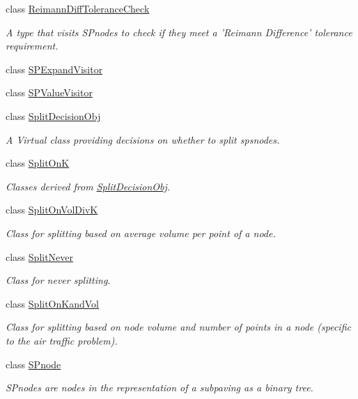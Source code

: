 \begin{DoxyCompactItemize}
class \hyperlink{classsubpavings_1_1ReimannDiffToleranceCheck}{\-Reimann\-Diff\-Tolerance\-Check}
\begin{DoxyCompactList}\small\item\em \-A type that visits  \-S\-Pnodes to check if they meet a '\-Reimann \-Difference' tolerance requirement. \end{DoxyCompactList}\item 
class \hyperlink{classsubpavings_1_1SPExpandVisitor}{\-S\-P\-Expand\-Visitor}
\item 
class \hyperlink{classsubpavings_1_1SPValueVisitor}{\-S\-P\-Value\-Visitor}
\item 
class \hyperlink{classsubpavings_1_1SplitDecisionObj}{\-Split\-Decision\-Obj}
\begin{DoxyCompactList}\small\item\em \-A \-Virtual class providing decisions on whether to split spsnodes. \end{DoxyCompactList}\item 
class \hyperlink{classsubpavings_1_1SplitOnK}{\-Split\-On\-K}
\begin{DoxyCompactList}\small\item\em \-Classes derived from \hyperlink{classsubpavings_1_1SplitDecisionObj}{\-Split\-Decision\-Obj}. \end{DoxyCompactList}\item 
class \hyperlink{classsubpavings_1_1SplitOnVolDivK}{\-Split\-On\-Vol\-Div\-K}
\begin{DoxyCompactList}\small\item\em \-Class for splitting based on average volume per point of a node. \end{DoxyCompactList}\item 
class \hyperlink{classsubpavings_1_1SplitNever}{\-Split\-Never}
\begin{DoxyCompactList}\small\item\em \-Class for never splitting. \end{DoxyCompactList}\item 
class \hyperlink{classsubpavings_1_1SplitOnKandVol}{\-Split\-On\-Kand\-Vol}
\begin{DoxyCompactList}\small\item\em \-Class for splitting based on node volume and number of points in a node (specific to the air traffic problem). \end{DoxyCompactList}\item 
class \hyperlink{classsubpavings_1_1SPnode}{\-S\-Pnode}
\begin{DoxyCompactList}\small\item\em \-S\-Pnodes are nodes in the representation of a subpaving as a binary tree. \end{DoxyCompactList}\item 

\end{DoxyCompactItemize}
